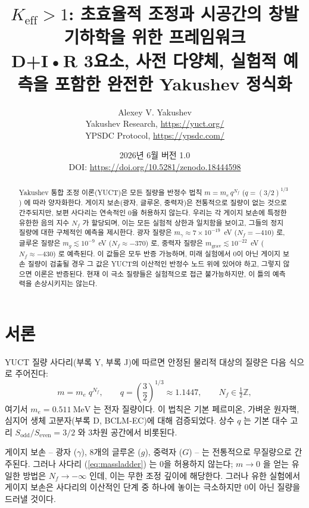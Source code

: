 \documentclass[11pt,a4paper]{article}
\title{$K_{\mathrm{eff}} > 1$: 초효율적 조정과 시공간의 창발 기하학을 위한 프레임워크 \\ 
	\large D+I•R 3요소, 사전 다양체, 실험적 예측을 포함한 완전한 Yakushev 정식화}
\author{Alexey V. Yakushev \\
	Yakushev Research, \url{https://yuct.org/} \\
	YPSDC Protocol, \url{https://ypsdc.com/}}
\date{2026년 6월 \quad 버전 1.0 \\ \medskip
	DOI: \url{https://doi.org/10.5281/zenodo.18444598}}
\begin{document}
	
	\maketitle
	
	\begin{abstract}
		Yakushev 통합 조정 이론(YUCT)은 모든 질량을 반정수 법칙 $m = m_e \, q^{N_f}$ ($q = (3/2)^{1/3}$) 에 따라 양자화한다.
		게이지 보손(광자, 글루온, 중력자)은 전통적으로 질량이 없는 것으로 간주되지만, 보편 사다리는 연속적인 0을 허용하지 않는다.
		우리는 각 게이지 보손에 특정한 유한한 음의 지수 $N_f$ 가 할당되며, 이는 모든 실험적 상한과 일치함을 보이고,
		그들의 정지 질량에 대한 구체적인 예측을 제시한다. 광자 질량은 $m_\gamma \approx 7\times 10^{-19}$~eV ($N_f = -410$) 로,
		글루온 질량은 $m_g \lesssim 10^{-9}$~eV ($N_f \approx -370$) 로, 중력자 질량은 $m_{\mathrm{grav}} \lesssim 10^{-22}$~eV
		($N_f \approx -430$) 로 예측된다. 이 값들은 모두 반증 가능하며, 미래 실험에서 0이 아닌 게이지 보손 질량이 검출될 경우
		그 값은 YUCT의 이산적인 반정수 노드 위에 있어야 하고, 그렇지 않으면 이론은 반증된다. 현재 이 극소 질량들은
		실험적으로 접근 불가능하지만, 이 틀의 예측력을 손상시키지는 않는다.
	\end{abstract}
	
	\newpage
	\tableofcontents
	\newpage
	
	\section{서론}
	
	YUCT 질량 사다리(부록 Y, 부록 J)에 따르면 안정된 물리적 대상의 질량은 다음 식으로 주어진다:
	\begin{equation}\label{eq:massladder}
		m = m_e \; q^{N_f}, \qquad q = \left(\frac{3}{2}\right)^{\!1/3} \approx 1.1447,
		\qquad N_f \in \tfrac12\mathbb{Z},
	\end{equation}
	여기서 $m_e = 0.511~\mathrm{MeV}$ 는 전자 질량이다. 이 법칙은 기본 페르미온, 가벼운 원자핵, 심지어 생체 고분자(부록 D, BCLM‑EC)에 대해 검증되었다.
	상수 $q$ 는 기본 대수 고리 $S_{\mathrm{odd}}/S_{\mathrm{even}} = 3/2$ 와 3차원 공간에서 비롯된다.
	
	게이지 보손 – 광자 ($\gamma$), 8개의 글루온 ($g$), 중력자 ($G$) – 는 전통적으로 무질량으로 간주된다.
	그러나 사다리 (\ref{eq:massladder}) 는 0을 허용하지 않는다; $m \to 0$ 을 얻는 유일한 방법은 $N_f \to -\infty$ 인데,
	이는 무한 조정 깊이에 해당한다. 그러나 유한 실험에서 게이지 보손은 사다리의 이산적인 단계 중 하나에 놓이는
	극소하지만 0이 아닌 질량을 드러낼 것이다.
	
\end{document}
